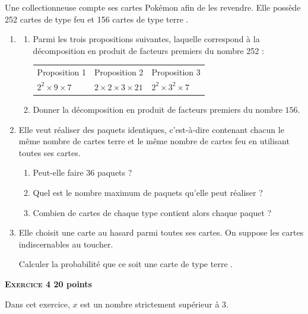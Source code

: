 \documentclass[11pt]{article}
\begin{document}
Une collectionneuse compte ses cartes Pokémon afin de les revendre. Elle possède 252 cartes de type \og feu \fg{} et 156 cartes de type \og terre \fg.
\begin{enumerate}
\item  \begin{enumerate}
\item  Parmi les trois propositions suivantes, laquelle correspond à la décomposition en produit de facteurs premiers du nombre 252 :

\begin{center}
\begin{tabularx}{9cm}{|*{3}{>{\centering \arraybackslash}X|}}\hline
Proposition 1 &Proposition 2& Proposition 3\\
 $2^2\times 9\times 7$ &$2\times 2\times 3\times 21$ &$2^2 \times 3^2\times  7$\\\hline
\end{tabularx}
\end{center}
\item Donner la décomposition en produit de facteurs premiers du nombre $156$.
\end{enumerate}
\item Elle veut réaliser des paquets identiques, c'est-à-dire contenant chacun le même nombre de cartes \og terre \fg{} et le même nombre de cartes \og feu \fg{} en utilisant toutes ses cartes.
\begin{enumerate}
\item Peut-elle faire 36 paquets ?
\item Quel est le nombre maximum de paquets qu'elle peut réaliser ?
\item Combien de cartes de chaque type contient alors chaque paquet ?
\end{enumerate}
\item Elle choisit une carte au hasard parmi toutes ses cartes. On suppose les cartes  indiscernables au toucher.

Calculer la probabilité que ce soit une carte de type \og terre \fg.
\end{enumerate}

\vspace{0.5cm}

\textbf{{\large \textsc{Exercice 4}} \hfill 20 points}

\medskip

Dans cet exercice, $x$ est un nombre strictement supérieur à 3.
\end{document}
